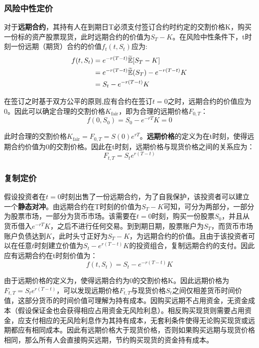 \documentclass[11pt]{article}
\begin{document}
\subsubsection{风险中性定价}

对于\textbf{远期合约}，其持有人在到期日T必须支付签订合约时约定的交割价格K，购买一份标的资产股票现货，此时远期合约的价值为$S_T-K$。在风险中性条件下，t时刻一份远期（期货）合约的价值$f_t(t,S_t)$应为:
\begin{align*}
    f(t,S_t) &= e^{-r(T-t)} \widetilde{\mathbb{E}}[S_T - K] \\
    &= e^{-r(T-t)} \widetilde{\mathbb{E}}(S_T) - e^{-r(T-t)} K \\
    &= S_t - e^{-r(T-t)} K
\end{align*}

在签订之时基于双方公平的原则,应有合约在签订$t=0$之时，远期合约的价值应为0。因此可以确定合理的交割价格$K_{\text{fair}}$，即为合理的远期价格$F_{0,T}$：
\begin{equation*}
    f(0,S_0) = S_0 - e^{-rT}K = 0
\end{equation*}

此时合理的交割价格$K_{\text{fair}} = F_{0,T} = S(0) e^{rT}$。\textbf{远期价格}的定义为在t时刻，使得远期合约价值为0的交割价格。因此在t时刻，远期价格与现货价格之间的关系应为：
\begin{equation*}
    \boxed{
        F_{t,T} = S_t e^{r(T-t)}
    }
\end{equation*}

\subsubsection{复制定价}

假设投资者在$t=0$时刻出售了一份远期合约，为了自我保护，该投资者可以建立一个\textbf{静态对冲}。由远期合约在T时刻的价值为$S_T - K$可知，可分为两部分，一部分为股票市场，一部分为货币市场。该需要在$t=0$时刻，购买一份股票$S_0$，并且从货币借入$e^{-rT}K$，之后不进行任何交易。到到期日期，股票账户为$S_T$，而货币市场账户负债达到$K$，此时头寸正好为$S_T-K$，为远期合约的价值。且由于该投资者可以在任意$t$时刻建立价值为$S_t - e^{r(T-t)}K$的投资组合，复制远期合约的支付。因此应有远期合约在t时刻价值为：
\begin{equation*}
        f(t,S_t) =  S_t - e^{-r(T-t)} K
\end{equation*}

由于远期价格的定义为，使得远期合约为0的交割价格K。因此远期价格为$F_{t,T} = S_t e^{r(T-t)}$，可以发现远期价格$F_{t,T}$与现货价格$S_t$之间仅相差货币时间价值，这部分货币的时间价值可理解为持有成本。因购买远期不占用资金，无资金成本（假设保证金也会获得相应占用资金无风险利息）。相反购买现货则需要占用资金，应支付相应的无风险利息作为其持有成本，无套利条件使得无论购买现货或远期都应有相同成本。因此有远期价格大于现货价格，否则如果购买远期与现货价格相同，那么所有人会直接购买远期，节约购买现货的资金持有成本。
\end{document}
